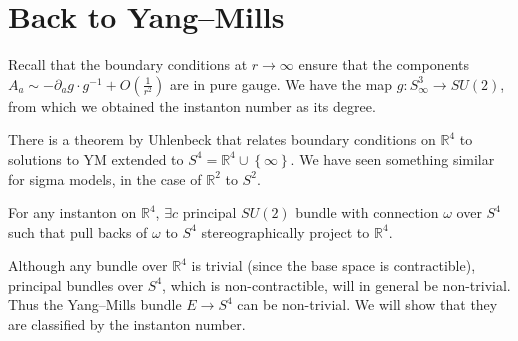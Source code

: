 
\section{Back to Yang--Mills}%
\label{sec:back_to_yang_mills}

Recall that the boundary conditions at $r \to \infty$ ensure that the components $A_{a} \sim -\partial_{a} g \cdot g^{-1} + O(\frac{1}{r^2})$ are in pure gauge.  We have the map $g \colon S_{\infty}^3 \to SU(2)$, from which we obtained the instanton number as its degree.

There is a theorem by Uhlenbeck that relates boundary conditions on $\mathbb{R}^4$ to solutions to YM extended to $S^4 = \mathbb{R}^4 \cup \left\{\infty\right\}$.
We have seen something similar for sigma models, in the case of $\mathbb{R}^2$ to $S^2$.
\begin{theorem}[Uhlenbeck (1984?)]
  For any instanton on $\mathbb{R}^4$, $\exists c$ principal $SU(2)$ bundle with connection $\omega$ over $S^4$ such that pull backs of $\omega$ to $S^4$ stereographically project to $\mathbb{R}^4$.
\end{theorem}
\begin{leftbar}
  Although any bundle over $\mathbb{R}^4$ is trivial (since the base space is contractible), principal bundles over $S^4$, which is non-contractible, will in general be non-trivial. Thus the Yang--Mills bundle $E \to S^4$ can be non-trivial. We will show that they are classified by the instanton number.
\end{leftbar}

